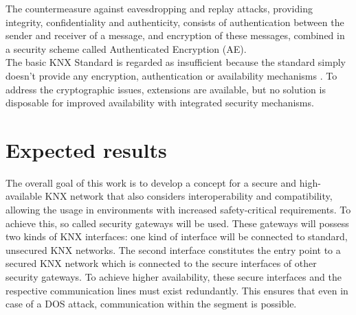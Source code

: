 \documentclass[a4paper,11pt,oneside]{memoir}
\begin{document}
The countermeasure against eavesdropping and replay attacks, providing integrity, confidentiality and authenticity, consists of authentication
between the sender and receiver of a message, and encryption of these messages, combined in a security scheme
called Authenticated Encryption (AE).
\\

The basic KNX Standard is regarded as insufficient because the standard simply doesn't provide any encryption, authentication 
or availability mechanisms \cite{knxSpec}. To address the cryptographic issues, extensions are available, but no solution is disposable for 
improved availability with integrated security mechanisms.


\section{Expected results}

The overall goal of this work is to develop a concept for a secure and high-available KNX network that also considers interoperability and compatibility, 
allowing the usage in environments with increased safety-critical requirements. 
To achieve this, so called security gateways will be used. These gateways will possess two kinds of KNX interfaces: one kind of interface will be
connected to standard, unsecured KNX networks.
The second interface constitutes the entry point to a secured KNX network which is connected to the secure interfaces of other
security gateways. To achieve higher availability, these secure interfaces and the respective communication lines must exist redundantly. This ensures that
even in case of a DOS attack, communication within the segment is possible.
\end{document}
